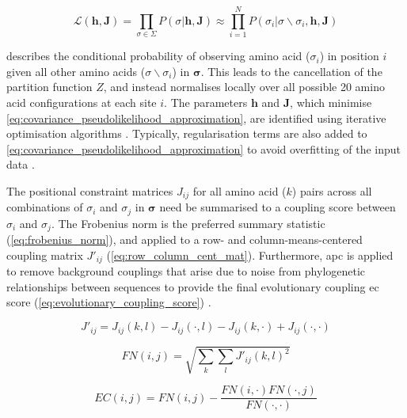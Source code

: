 \begin{equation}
    \mathcal{L}\left(\mathbf{h},\mathbf{J}\right)=\prod_{\sigma\in\Sigma}P\left(\sigma\rvert\mathbf{h},\mathbf{J}\right)\approx\prod_{i=1}^{N}P\left(\sigma_i\rvert\sigma\backslash\sigma_i,\mathbf{h},\mathbf{J}\right)
    \label{eq:covariance_pseudolikelihood_approximation}
\end{equation}

 describes the conditional probability of observing amino acid ($\sigma_i$) in position $i$ given all other amino acids ($\sigma\backslash\sigma_i$) in $\boldsymbol{\sigma}$. This leads to the cancellation of the partition function $Z$, and instead normalises locally over all possible 20 amino acid configurations at each site $i$. The parameters $\mathbf{h}$ and $\mathbf{J}$, which minimise \cref{eq:covariance_pseudolikelihood_approximation}, are identified using iterative optimisation algorithms \cite{Hopf2017-pp}. Typically, regularisation terms are also added to \cref{eq:covariance_pseudolikelihood_approximation} to avoid overfitting of the input data \cite{Hopf2017-pp}.

The positional constraint matrices $J_{ij}$ for all amino acid ($k$) pairs across all combinations of $\sigma_i$ and $\sigma_j$ in $\boldsymbol{\sigma}$ need be summarised to a coupling score between $\sigma_i$ and $\sigma_j$. The Frobenius norm is the preferred summary statistic (\cref{eq:frobenius_norm}), and applied to a row- and column-means-centered coupling matrix $J'_{ij}$ (\cref{eq:row_column_cent_mat}). Furthermore, \gls{apc} is applied to remove background couplings that arise due to noise from phylogenetic relationships between sequences to provide the final evolutionary coupling \gls{ec} score (\cref{eq:evolutionary_coupling_score}) \cite{Dunn2008-ao,Jones2012-ks,Ekeberg2013-ay,Kamisetty2013-le,Seemayer2014-zp}.

\begin{equation}
    J'_{ij}=J_{ij}(k,l)-J_{ij}(\cdot,l)-J_{ij}(k,\cdot)+J_{ij}(\cdot,\cdot)
    \label{eq:row_column_cent_mat}
\end{equation}

\begin{equation}
    FN(i,j)=\sqrt{\sum_{k}\sum_{l}J'_{ij}(k,l)^2}
    \label{eq:frobenius_norm}
\end{equation}

\begin{equation}
    EC(i,j)=FN(i,j)-\frac{FN(i,\cdot)FN(\cdot,j)}{FN(\cdot,\cdot)}
    \label{eq:evolutionary_coupling_score}
\end{equation}

